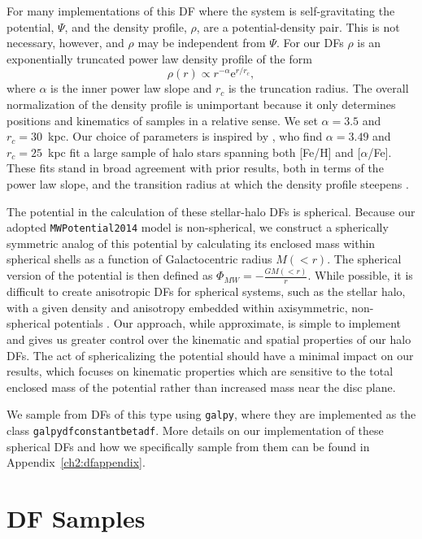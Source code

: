 For many implementations of this DF where the system is self-gravitating the potential, $\Psi$, and the density profile, $\rho$, are a potential-density pair. This is not necessary, however, and $\rho$ may be independent from $\Psi$. For our DFs $\rho$ is an exponentially truncated power law density profile of the form
\begin{equation}
    \rho(r) \propto r^{-\alpha}\mathrm{e}^{r/r_{c}},
\end{equation}
where $\alpha$ is the inner power law slope and $r_{c}$ is the truncation radius. The overall normalization of the density profile is unimportant because it only determines positions and kinematics of samples in a relative sense. We set $\alpha=3.5$ and $r_{c}=30$~kpc. Our choice of parameters is inspired by \textcite{mackereth20}, who find $\alpha=3.49$ and $r_{c}=25$~kpc fit a large sample of halo stars spanning both [Fe/H] and [$\alpha$/Fe]. These fits stand in broad agreement with prior results, both in terms of the power law slope, and the transition radius at which the density profile steepens \parencite{deason11,xue15,iorio18}.

The potential in the calculation of these stellar-halo DFs is spherical. Because our adopted \texttt{MWPotential2014} model is non-spherical, we construct a spherically symmetric analog of this potential by calculating its enclosed mass within spherical shells as a function of Galactocentric radius $M(<r)$. The spherical version of the potential is then defined as $\Phi_{MW} = -\frac{GM(<r)}{r}$. While possible, it is difficult to create anisotropic DFs for spherical systems, such as the stellar halo, with a given density and anisotropy embedded within axisymmetric, non-spherical potentials \parencite{posti15,williams15}. Our approach, while approximate, is simple to implement and gives us greater control over the kinematic and spatial properties of our halo DFs. The act of sphericalizing the potential should have a minimal impact on our results, which focuses on kinematic properties which are sensitive to the total enclosed mass of the potential rather than increased mass near the disc plane. 

We sample from DFs of this type using \texttt{galpy}, where they are implemented as the class \texttt{galpydfconstantbetadf}. More details on our implementation of these spherical DFs and how we specifically sample from them can be found in Appendix~\ref{ch2:dfappendix}.

\section{DF Samples}
\label{ch2:sec:DFSamples}

